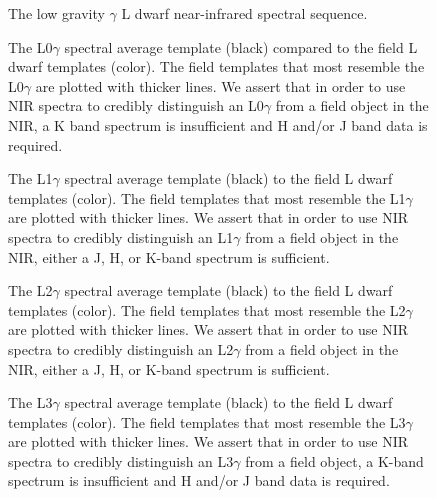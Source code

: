 \documentclass[12pt,preprint]{aastex}
\begin{document}
\begin{figure}
	\caption{The low gravity $\gamma$ L dwarf near-infrared spectral sequence.}
	\label{fig:lg_sequence}
\end{figure}
	


\begin{figure}
	\caption{The L0$\gamma$ spectral average template (black) compared to the field L dwarf templates (color). The field templates that most resemble the L0$\gamma$ are plotted with thicker lines. We assert that in order to use NIR spectra to credibly distinguish an L0$\gamma$ from a field object in the NIR, a K band spectrum is insufficient and H and/or J band data is required.}
	\label{fig:L0lg-field}
\end{figure}

\begin{figure}
	\caption{The L1$\gamma$ spectral average template (black) to the field L dwarf templates (color). The field templates that most resemble the L1$\gamma$ are plotted with thicker lines. We assert that in order to use NIR spectra to credibly distinguish an L1$\gamma$ from a field object in the NIR, either a J, H, or K-band spectrum is sufficient.}
	\label{fig:L1lg-field}
\end{figure}

\begin{figure}
	\caption{The L2$\gamma$ spectral average template (black) to the field L dwarf templates (color). The field templates that most resemble the L2$\gamma$ are plotted with thicker lines. We assert that in order to use NIR spectra to credibly distinguish an L2$\gamma$ from a field object in the NIR, either a J, H, or K-band spectrum is sufficient.}
	\label{fig:L2lg-field}
\end{figure}

\begin{figure}
	\caption{The L3$\gamma$ spectral average template (black) to the field L dwarf templates (color). The field templates that most resemble the L3$\gamma$ are plotted with thicker lines. We assert that in order to use NIR spectra to credibly distinguish an L3$\gamma$ from a field object, a K-band spectrum is insufficient and H and/or J band data is required.}
	\label{fig:L3lg-field}
\end{figure}
\end{document}
